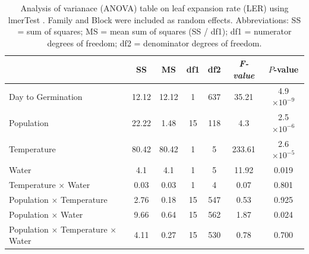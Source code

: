 \documentclass[11pt, oneside]{article}
\newcommand{\pkg}[1]{{\fontseries{b}\selectfont #1}}
\begin{document}


\begin{table}[htbp]
	\fontsize{10}{12}
	\selectfont
	\caption[ANOVA table, leaf expansion rate]{Analysis of varianace (ANOVA) table on leaf expansion rate (LER) using \pkg{lmerTest} \citep{Kuznetsova_etal_2016}. Family and Block were included as random effects. Abbreviations: SS = sum of squares; MS = mean sum of squares (SS / df1); df1 = numerator degrees of freedom; df2 = denominator degrees of freedom.}
	\begin{center}
	\begin{tabular}{lcccccc}
	\toprule

  & SS & MS & df1 & df2 & \em{F}-value & $P$-value \\ \midrule
  Day to Germination & 12.12 & 
    12.12 & 1 & 
    637 & 35.21 &
    4.9 $\times10^{-9}$ \\
  Population & 22.22 & 1.48 & 
    15 & 118 & 
    4.3 & 2.5 $\times10^{-6}$ \\
  Temperature & 80.42 & 
    80.42 & 1 &
    5 & 233.61 &
    2.6 $\times10^{-5}$ \\
  Water & 4.1 & 4.1 & 
    1 & 5 & 
    11.92 & 0.019 \\
  Temperature $\times$ Water & 0.03 & 
    0.03 & 
    1 & 
    4 & 
    0.07 &
    0.801 \\
  Population $\times$ Temperature & 2.76 & 
    0.18 & 
    15 & 
    547 & 
    0.53 &
    0.925 \\
  Population $\times$ Water & 9.66 & 
    0.64 & 
    15 &
    562 &
    1.87 & 
    0.024 \\
  Population $\times$ Temperature $\times$ Water & 
    4.11 & 
    0.27 & 
    15 & 
    530 & 
    0.78 & 
    0.700 \\
	\bottomrule
	\end{tabular}
	\label{table:TableS_fitLER}
	\end{center}
\end{table}

\end{document}
